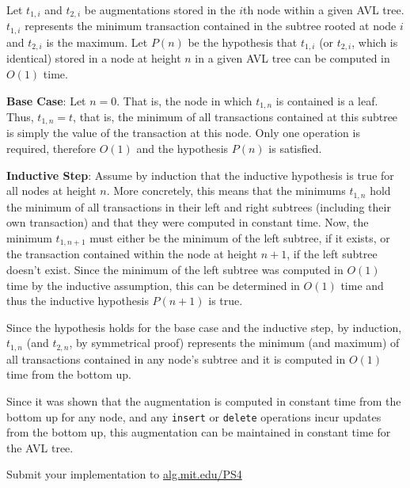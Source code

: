 \documentclass[12pt,twoside]{article}
\begin{document}
\begin{problems}
\begin{problemparts}
\problempart Let $ t_{1,i} $ and $ t_{2,i} $ be augmentations stored in the
    $i$th node within a given AVL tree. $ t_{1,i} $ represents the minimum
    transaction contained in the subtree rooted at node $i$ and $ t_{2,i} $
    is the maximum. Let $ P(n) $ be the hypothesis that $ t_{1,i} $ (or $
    t_{2,i} $, which is identical) stored in a node at height $ n $ in a
    given AVL tree can be computed in $ O(1) $ time.

    {\bf Base Case}: Let $ n = 0 $. That is, the node in which $ t_{1, n} $
    is contained is a leaf. Thus, $ t_{1, n} = t $, that is, the minimum of
    all transactions contained at this subtree is simply the value of the
    transaction at this node. Only one operation is required, therefore $
    O(1) $ and the hypothesis $ P(n) $ is satisfied.

    {\bf Inductive Step}: Assume by induction that the inductive hypothesis
    is true for all nodes at height $ n $. More concretely, this means that
    the minimums $ t_{1, n} $ hold the minimum of all transactions in their
    left and right subtrees (including their own transaction) and that they
    were computed in constant time. Now, the minimum $ t_{1,n+1} $ must
    either be the minimum of the left subtree, if it exists, or the
    transaction contained within the node at height $n + 1$, if the left
    subtree doesn't exist. Since the minimum of the left subtree was computed
    in $ O(1) $ time by the inductive assumption, this can be determined in $
    O(1) $ time and thus the inductive hypothesis $ P(n + 1) $ is true.

    Since the hypothesis holds for the base case and the inductive step, by
    induction, $ t_{1, n} $ (and $ t_{2,n} $, by symmetrical proof)
    represents the minimum (and maximum) of all transactions contained in any
    node's subtree and it is computed in $ O(1) $ time from the bottom up.

    \smallbreak
    
    Since it was shown that the augmentation is computed in constant time
    from the bottom up for any node, and any {\tt insert} or {\tt delete}
    operations incur updates from the bottom up, this augmentation can be
    maintained in constant time for the AVL tree.

\problempart 
\problempart
\problempart
\problempart Submit your implementation to {\small\url{alg.mit.edu/PS4}}
\end{problemparts}

\end{problems}
\end{document}
